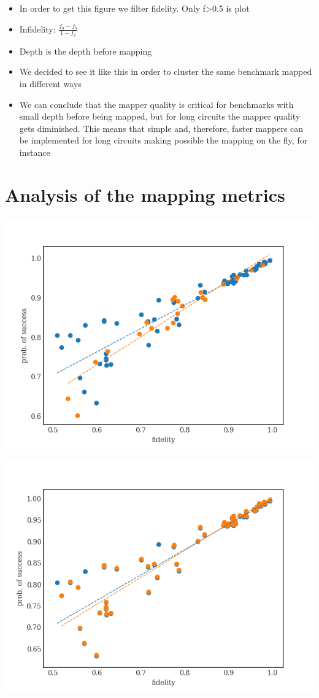 \begin{itemize}
\item In order to get this figure we filter fidelity. Only f>0.5 is plot
\item Infidelity: \(\frac{f_a - f_b}{1 - f_b}\)
\item Depth is the depth before mapping
\item We decided to see it like this in order to cluster the same benchmark mapped in different ways
\item We can conclude that the mapper quality is critical for benchmarks with small depth before being mapped, but for long circuits the mapper quality gets diminished. This means that simple and, therefore, faster mappers can be implemented for long circuits making possible the mapping on the fly, for instance
\end{itemize}

\section*{Analysis of the mapping metrics}
\label{sec:orgd531432}

\begin{center}
\includegraphics[width=.9\linewidth]{figures/f_ps_correlation_with_meas_error.png}
\end{center}

\begin{center}
\includegraphics[width=.9\linewidth]{figures/f_ps_correlation_no_meas_error.png}
\end{center}


